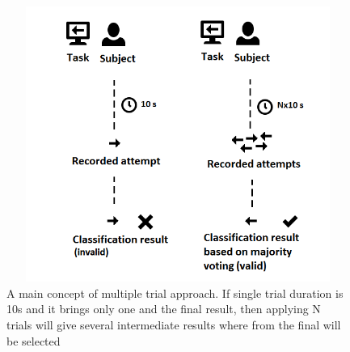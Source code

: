 \documentclass[12pt]{article}
\begin{document}
\begin{figure} [H]
\begin{center}
\includegraphics[height=9cm, width=1\textwidth]{main}
\caption{A main concept of multiple trial approach. If single trial duration is 10s and it brings only one and the final result, then applying N trials will give several intermediate results where from the final will be selected}
\label{fig:condorcet}
\end{center}
\end{figure}
\end{document}

